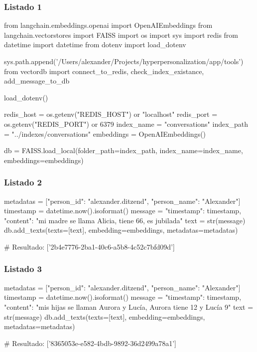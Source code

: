 \subsubsection{Listado 1}
\label{anexo:code-4-1-3-1}

\begin{APACode}
from langchain.embeddings.openai import OpenAIEmbeddings 
from langchain.vectorstores import FAISS
import os 
import sys 
import redis
from datetime import datetime 
from dotenv import load_dotenv

sys.path.append('/Users/alexander/Projects/hyperpersonalization/app/tools') 
from vectordb import connect_to_redis, check_index_existance, add_message_to_db

load_dotenv()

redis_host = os.getenv("REDIS_HOST") or "localhost" 
redis_port = os.getenv("REDIS_PORT") or 6379 
index_name = "conversations"
index_path = "../indexes/conversations" 
embeddings = OpenAIEmbeddings()

db = FAISS.load_local(folder_path=index_path, index_name=index_name, 
                      embeddings=embeddings)
\end{APACode}

\subsubsection{Listado 2}
\label{anexo:code-4-1-3-2}

\begin{APACode}
metadatas = [{"person_id": "alexander.ditzend", "person_name": "Alexander"}] 
timestamp = datetime.now().isoformat()
message = {"timestamp": timestamp, 
           "content": "mi madre se llama Alicia, tiene 66, es jubilada"} 
text = str(message)
db.add_texts(texts=[text], embedding=embeddings, metadatas=metadatas)

# Resultado: ['2b4e7776-2ba1-40c6-a5b8-4c52c7bfd09d']
\end{APACode}

\subsubsection{Listado 3}
\label{anexo:code-4-1-3-3}

\begin{APACode}
metadatas = [{"person_id": "alexander.ditzend", "person_name": "Alexander"}] 
timestamp = datetime.now().isoformat()
message = {"timestamp": timestamp, 
           "content": "mis hijas se llaman Aurora y Lucía, Aurora tiene 12 y Lucía 9"} 
text = str(message)
db.add_texts(texts=[text], embedding=embeddings, metadatas=metadatas)

# Resultado: ['8365053e-e582-4bdb-9892-36d2499a78a1']
\end{APACode}

